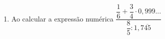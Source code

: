 \documentclass[a4paper,14pt]{article}
\begin{document}
\begin{multicols}{2}
\begin{enumerate}
			\item Ao calcular a expressão numérica $\dfrac{\dfrac{1}{6} + \dfrac{3}{4} \cdot 0,999...}{\dfrac{8}{5}:1,7\overline{45}}$
		\end{enumerate}
		$~$ \\ $~$ \\ $~$ \\ $~$ \\ $~$ \\ $~$ \\ $~$ \\ $~$ \\ $~$ \\ $~$ \\ $~$ \\ $~$ \\ $~$ \\ $~$ \\ $~$ \\ $~$ \\ $~$ \\ $~$ \\ $~$ \\
	\end{multicols}
\end{document}
